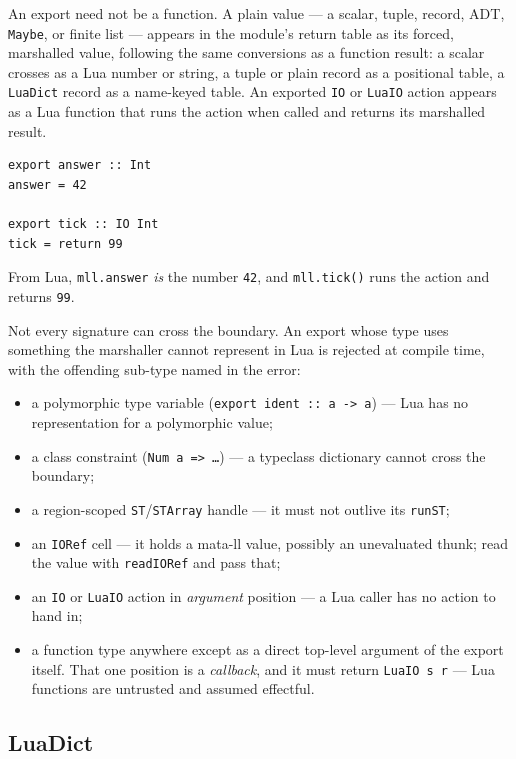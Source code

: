 \documentclass[11pt,a4paper]{article}
\begin{document}
An export need not be a function.  A plain value --- a scalar, tuple,
record, ADT, \texttt{Maybe}, or finite list --- appears in the
module's return table as its forced, marshalled value, following the
same conversions as a function result: a scalar crosses as a Lua
number or string, a tuple or plain record as a positional table, a
\texttt{LuaDict} record as a name-keyed table.  An exported
\texttt{IO} or \texttt{LuaIO} action appears as a Lua function that
runs the action when called and returns its marshalled result.

\begin{lstlisting}
export answer :: Int
answer = 42

export tick :: IO Int
tick = return 99
\end{lstlisting}

From Lua, \texttt{mll.answer} \emph{is} the number \texttt{42}, and
\texttt{mll.tick()} runs the action and returns \texttt{99}.

Not every signature can cross the boundary.  An export whose type
uses something the marshaller cannot represent in Lua is rejected at
compile time, with the offending sub-type named in the error:

\begin{itemize}
\item a polymorphic type variable (\texttt{export ident :: a -> a})
  --- Lua has no representation for a polymorphic value;
\item a class constraint (\texttt{Num a => \ldots}) --- a typeclass
  dictionary cannot cross the boundary;
\item a region-scoped \texttt{ST}/\texttt{STArray} handle --- it must
  not outlive its \texttt{runST};
\item an \texttt{IORef} cell --- it holds a mata-ll value, possibly an
  unevaluated thunk; read the value with \texttt{readIORef} and pass
  that;
\item an \texttt{IO} or \texttt{LuaIO} action in \emph{argument}
  position --- a Lua caller has no action to hand in;
\item a function type anywhere except as a direct top-level argument
  of the export itself.  That one position is a \emph{callback}, and
  it must return \texttt{LuaIO s r} --- Lua functions are untrusted
  and assumed effectful.
\end{itemize}

\subsection{LuaDict}
\label{sec:luadict}
\end{document}
